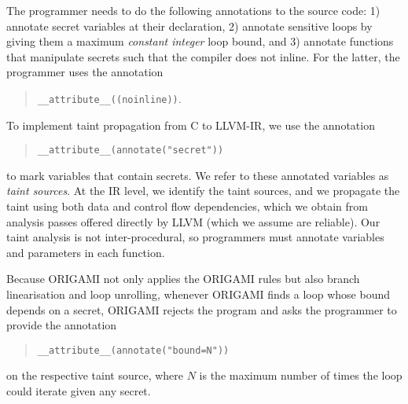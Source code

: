 {The programmer needs to do the following annotations to the source code: 1) annotate secret variables at their declaration, 2) annotate sensitive loops by giving them a maximum \emph{constant integer} loop bound, and 3) annotate functions that manipulate secrets such that the compiler does not inline. For the latter, the programmer uses the annotation
\begin{quote}
    \texttt{\_\_attribute\_\_((noinline))}. 
\end{quote}

To implement taint propagation from C to LLVM-IR, we use the annotation 
\begin{quote}
    \texttt{\_\_attribute\_\_(annotate("secret"))} 
\end{quote}
to mark variables that contain secrets. We refer to these annotated variables as \emph{taint sources}. At the IR level, we identify the taint sources, and we propagate the taint using both data and control flow dependencies, which we obtain from analysis passes offered directly by LLVM (which we assume are reliable). Our taint analysis is not inter-procedural, so programmers must annotate variables and parameters in each function.

Because ORIGAMI not only applies the ORIGAMI rules but also branch linearisation and loop unrolling, whenever ORIGAMI finds a loop whose bound depends on a secret, ORIGAMI rejects the program and asks the programmer to provide the annotation 
\begin{quote}
    \texttt{\_\_attribute\_\_(annotate("bound=N"))}    
\end{quote}
 on the respective taint source, where $N$ is the maximum number of times the loop could iterate given any secret. 


%


}
